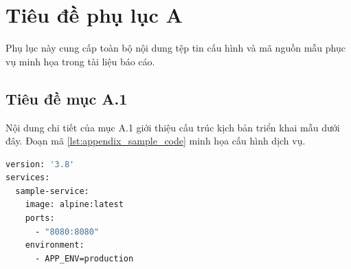 
\chapter{Tiêu đề phụ lục A}
\label{app:appendix_a}

Phụ lục này cung cấp toàn bộ nội dung tệp tin cấu hình và mã nguồn mẫu phục vụ minh họa trong tài liệu báo cáo.

\section{Tiêu đề mục A.1}
\label{sec:section_a_1}

Nội dung chi tiết của mục A.1 giới thiệu cấu trúc kịch bản triển khai mẫu dưới đây. Đoạn mã \ref{lst:appendix_sample_code} minh họa cấu hình dịch vụ.

\begin{lstlisting}[language=bash, caption={Tiêu đề đoạn mã A.1}, label={lst:appendix_sample_code}]
version: '3.8'
services:
  sample-service:
    image: alpine:latest
    ports:
      - "8080:8080"
    environment:
      - APP_ENV=production
\end{lstlisting}
